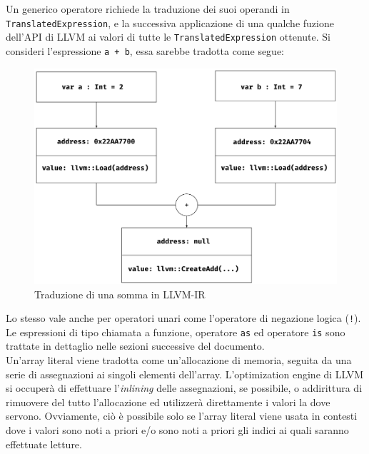 \newpage

Un generico operatore richiede la traduzione dei suoi operandi in \texttt{TranslatedExpression}, e la
successiva applicazione di una qualche fuzione dell'API di LLVM ai valori di tutte le \texttt{TranslatedExpression} ottenute. Si consideri
l'espressione \texttt{a + b}, essa sarebbe tradotta come segue: \\

\vspace{0.3cm}
\begin{figure}[H]
    \includegraphics[width=\textwidth]{../../Assets/LLVMExpr5}
    \caption{Traduzione di una somma in LLVM-IR}
\end{figure}
\vspace{0.3cm}

Lo stesso vale anche per operatori unari come l'operatore di negazione logica (\texttt{!}). Le espressioni 
di tipo chiamata a funzione, operatore \texttt{as} ed operatore \texttt{is} sono trattate in dettaglio 
nelle sezioni successive del documento. \\

Un'array literal viene tradotta come un'allocazione di memoria, seguita da una serie di assegnazioni
ai singoli elementi dell'array. L'optimization engine di LLVM si occuperà di effettuare l'\textit{inlining}
delle assegnazioni, se possibile, o addirittura di rimuovere del tutto l'allocazione ed utilizzerà direttamente 
i valori la dove servono. Ovviamente, ciò è possibile solo se l'array literal viene usata in contesti 
dove i valori sono noti a priori e/o sono noti a priori gli indici ai quali saranno effettuate letture. \\